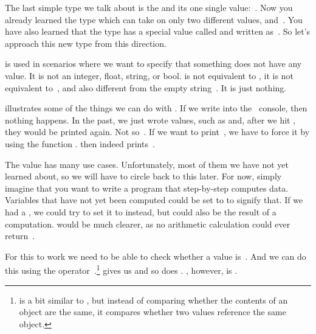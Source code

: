 %
\label{sec:none}%
%
%
%
%
The last simple type we talk about is the  and its one single value:~.
Now you already learned the type  which can take on only two different values,  and~.
You have also learned that the type  has a special value called  and written as~.
So let's approach this new type from this direction.

 is used in scenarios where we want to specify that something does not have any value.
It is not an integer, float, string, or bool.
 is not equivalent to , it is not equivalent to~, and also different from the empty string~\pythonIdx{\textquotedbl\textquotedbl}.
It is just nothing.

 illustrates some of the things we can do with .
If we write  into the \python\ console, then nothing happens.
In the past, we just wrote values, such as  and, after we hit \keys{\enter}, they would be printed again.
Not so~.
If we want to print~, we have to force it by using the function .
 then indeed prints~.

The value  has many use cases.
Unfortunately, most of them we have not yet learned about, so we will have to circle back to this later.
For now, simply imagine that you want to write a program that step-by-step computes data.
Variables that have not yet been computed could be set to  to signify that.
If we had a , we could try to set it to  instead, but  could also be the result of a computation.
 would be much clearer, as no arithmetic calculation could ever return~.

For this to work we need to be able to check whether a value is~.
And we can do this using the operator~.\footnote{%
 is a bit similar to \pythonilIdx{==}, but instead of comparing whether the contents of an object are the same, it compares whether two values reference the same object.}%
 gives us  and so does .
, however, is .

